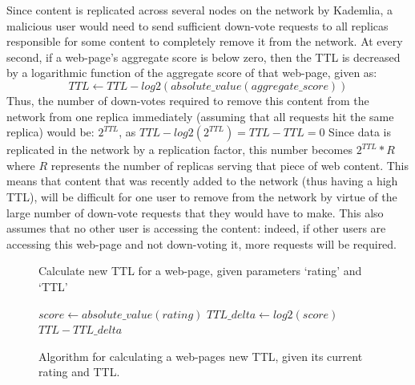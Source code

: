 Since content is replicated across several nodes on the network by Kademlia, a malicious user would need to send sufficient
down-vote requests to all replicas responsible for some content to completely remove it from the network.
At every second, if a web-page's aggregate score is below zero, then the TTL is decreased by a logarithmic
function of the aggregate score of that web-page, given as:
\[ TTL \leftarrow TTL - log2(absolute\_value(aggregate\_score)) \] 
Thus, the number of down-votes required to remove this content from the network from one replica immediately
(assuming that all requests hit the same replica) would be: $ 2^{TTL} $, as $ TTL - log2(2^{TTL}) = TTL - TTL = 0 $
Since data is replicated in the network by a replication factor, this number becomes $ 2^{TTL} * R $
where $R$ represents the number of replicas serving that piece of web content.
This means that content that was recently added to the network (thus having a high TTL), will be difficult for one
user to remove from the network by virtue of the large number of down-vote requests that they would have to make.
This also assumes that no other user is accessing the content: indeed, if other users are accessing this web-page and
not down-voting it, more requests will be required.

\begin{figure}
    \begin{algorithm}[H]
        \caption{Calculate new TTL for a web-page, given parameters `rating' and `TTL'}
        \begin{algorithmic}
        \ENDIF
        \STATE $ score \leftarrow absolute\_value(rating) $
        \STATE $ TTL\_delta \leftarrow log2(score) $
        \RETURN $ TTL - TTL\_delta $
        \end{algorithmic}
    \end{algorithm}
    \caption{Algorithm for calculating a web-pages new TTL, given its current rating and TTL.}
    \label{fig:downvotealgo}
\end{figure}
